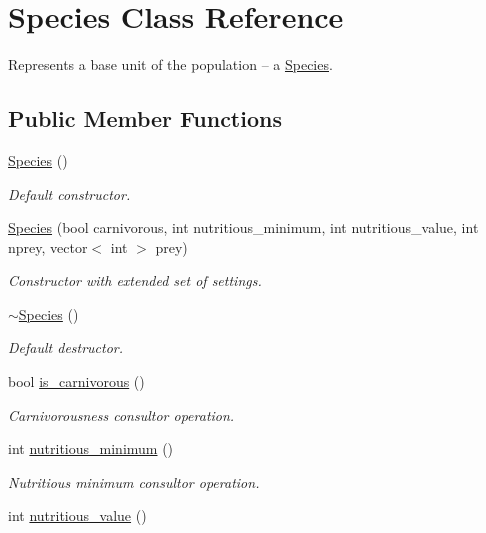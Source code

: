 \hypertarget{class_species}{\section{Species Class Reference}
\label{class_species}
}


Represents a base unit of the population – a \hyperlink{class_species}{Species}.  


\subsection*{Public Member Functions}
\begin{DoxyCompactItemize}
\item 
\hyperlink{class_species_abb0f8e3208b0cc676157b7dff837c0be}{Species} ()
\begin{DoxyCompactList}\small\item\em Default constructor. \end{DoxyCompactList}\item 
\hyperlink{class_species_a16b8ced46ad340a73971735788c4da6e}{Species} (bool carnivorous, int nutritious\-\_\-minimum, int nutritious\-\_\-value, int nprey, vector$<$ int $>$ prey)
\begin{DoxyCompactList}\small\item\em Constructor with extended set of settings. \end{DoxyCompactList}\item 
\hyperlink{class_species_af36f93648e2dedc2f05b6fb0c067f35e}{$\sim$\-Species} ()
\begin{DoxyCompactList}\small\item\em Default destructor. \end{DoxyCompactList}\item 
bool \hyperlink{class_species_ae9693788c20d6ba84b8dd950f1e90296}{is\-\_\-carnivorous} ()
\begin{DoxyCompactList}\small\item\em Carnivorousness consultor operation. \end{DoxyCompactList}\item 
int \hyperlink{class_species_a1ff07d6d5a5d03978d2c8df16f49b8d7}{nutritious\-\_\-minimum} ()
\begin{DoxyCompactList}\small\item\em Nutritious minimum consultor operation. \end{DoxyCompactList}\item 
int \hyperlink{class_species_abea0a065bd95c118115b6647fccb87a0}{nutritious\-\_\-value} ()

\end{DoxyCompactItemize}

